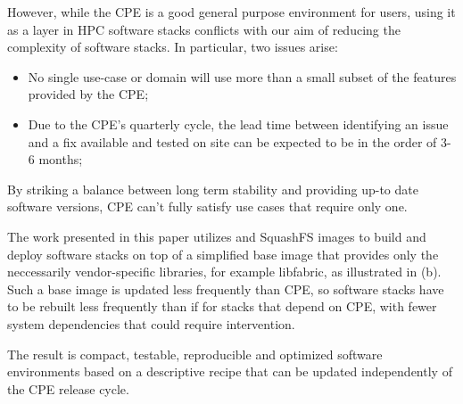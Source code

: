 However, while the CPE is a good general purpose environment for users, using it as a layer in HPC software stacks conflicts with our aim of reducing the complexity of software stacks.
In particular, two issues arise:
\begin{itemize}
    \item No single use-case or domain will use more than a small subset of the features provided by the CPE;
    \item Due to the CPE's quarterly cycle, the lead time between identifying an issue and a fix available and tested on site can be expected to be in the order of 3-6 months;
\end{itemize}
By striking a balance between long term stability and providing up-to date software versions, CPE can't fully satisfy use cases that require only one.

The work presented in this paper utilizes \spack and SquashFS images to build and deploy software stacks on top of a simplified base image that provides only the neccessarily vendor-specific libraries, for example libfabric, as illustrated in (b).
Such a base image is updated less frequently than CPE, so software stacks have to be rebuilt less frequently than if for stacks that depend on CPE, with fewer system dependencies that could require intervention.

The result is compact, testable, reproducible and optimized software environments based on a descriptive recipe that can be updated independently of the CPE release cycle.



